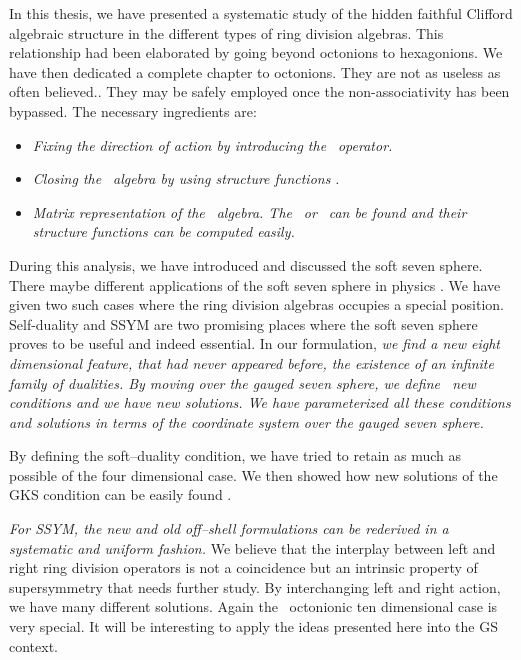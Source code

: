 \documentclass[a4paper,12pt]{book}
\begin{document}
In this thesis, we have presented a systematic study of the hidden faithful
Clifford algebraic structure in the different types of ring division
algebras. This relationship had been elaborated by going beyond octonions to
hexagonions. We have then dedicated a complete chapter to octonions. They
are not as useless as often believed.. They may be safely employed once the
non-associativity has been bypassed. The necessary ingredients are:

\begin{itemize}
\item  \emph{Fixing the direction of action by introducing the }\myHighlight{$\delta $}\coordHE{}%
\emph{\ operator.}

\item  \emph{Closing the }\myHighlight{$\delta $}\coordHE{}\emph{\ algebra by using structure
functions }\coordHE{}\emph{.}

\item  \emph{Matrix representation of the }\myHighlight{$\delta $}\coordHE{}\emph{\ algebra. The }\coordHE{}\emph{\ or }\coordHE{}\emph{\ can be found and
their structure functions can be computed easily.}
\end{itemize}

During this analysis, we have introduced and discussed the soft seven
sphere. There maybe different applications of the soft seven sphere in
physics \cite{berk1} \cite{berk2} \cite{brink} \cite{spt}. We have given two
such cases where the ring division algebras occupies a special position.
Self-duality and SSYM are two promising places where the soft seven sphere
proves to be useful and indeed essential. In our formulation, \emph{we find
a new eight dimensional feature, that had never appeared before, the
existence of an infinite family of dualities. By moving over the gauged
seven sphere, we define \ new conditions and we have new solutions. We have
parameterized all these conditions and solutions in terms of the coordinate
system over the gauged seven sphere.}

By defining the soft--duality condition, we have tried to retain as much as
possible of the four dimensional case. We then showed how new solutions of
the GKS condition can be easily found .

\emph{For SSYM, the new and old off--shell formulations can be rederived in
a systematic and uniform fashion.} We believe that the interplay between
left and right ring division operators is not a coincidence but an intrinsic
property of supersymmetry that needs further study. By interchanging left
and right action, we have many different solutions. Again the \ octonionic
ten dimensional case is very special. It will be interesting to apply the
ideas presented here into the GS context.
\end{document}
